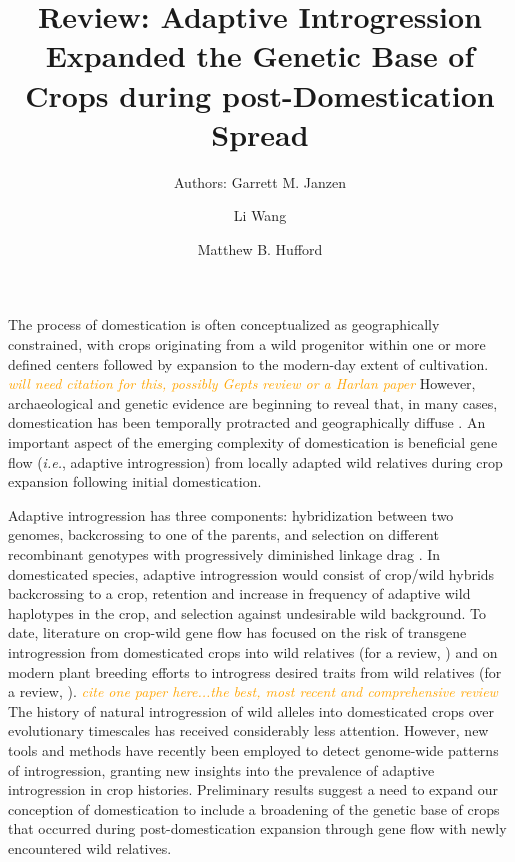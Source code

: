 \documentclass[11pt]{article}
\title{Review: Adaptive Introgression Expanded the Genetic Base of Crops during post-Domestication Spread}
\author[1]{Authors: Garrett M. Janzen}%
\author[1]{Li Wang}
\author[1,*]{Matthew B. Hufford}
\affil[1]{Department of Ecology, Evolution, and Organismal Biology, Iowa State University, Ames, Iowa, USA}
\affil[*]{Correspondence: mhufford@iastate.edu (M.B. Hufford)}
\date{}
\newcommand{\mbh}[1]{\textcolor{orange}{ \emph{\scriptsize  #1}} } %
\begin{document}
\maketitle



The process of domestication is often conceptualized as geographically constrained, with crops originating from a wild progenitor within one or more defined centers followed by expansion to the modern-day extent of cultivation. \mbh{will need citation for this, possibly Gepts review or a Harlan paper}
However, archaeological and genetic evidence are beginning to reveal that, in many cases, domestication has been temporally protracted and geographically diffuse \cite{brown2009complex, Meyer2016, wang2017, zhou2017, Fuller2014}.
An important aspect of the emerging complexity of domestication is beneficial gene flow (\emph{i.e.}, adaptive introgression) from locally adapted wild relatives during crop expansion following initial domestication.


Adaptive introgression has three components: hybridization between two genomes, backcrossing to one of the parents, and selection on different recombinant genotypes with progressively diminished linkage drag \cite{barton2001role, Feuillet200824}.
In domesticated species, adaptive introgression would consist of crop/wild hybrids backcrossing to a crop, retention and increase in frequency of adaptive wild haplotypes in the crop, and selection against undesirable wild background.
To date, literature on crop-wild gene flow has focused on the risk of transgene introgression from domesticated crops into wild relatives (for a review, \cite{stewart2003transgene}) and on modern plant breeding efforts to introgress desired traits from wild relatives (for a review, \cite{zamir2001improving, tanksley1997seed, hajjar2007use}). \mbh{cite one paper here...the best, most recent and comprehensive review}
The history of natural introgression of wild alleles into domesticated crops over evolutionary timescales has received considerably less attention.
However, new tools and methods have recently been employed to detect genome-wide patterns of introgression, granting new insights into the prevalence of adaptive introgression in crop histories.
Preliminary results suggest a need to expand our conception of domestication to include a broadening of the genetic base of crops that occurred during post-domestication expansion through gene flow with newly encountered wild relatives.
\end{document}
